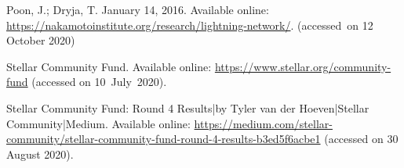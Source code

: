 \documentclass[applsci,article,accept,moreauthors,pdftex]{Definitions/mdpi}
\begin{document}
\begin{thebibliography}{999}
Poon, J.; Dryja, T.
  January 14, 2016.
Available online:   
\url{https://nakamotoinstitute.org/research/lightning-network/}.
\newblock (accessed~on 12 October 2020)  
  \pagebreak

Stellar Community Fund.  Available online:
\newblock \url{https://www.stellar.org/community-fund}  (accessed on 10~July~2020).

Stellar Community Fund: Round 4 Results|by Tyler van der Hoeven|Stellar
  Community|Medium.  Available online: 
  \url{https://medium.com/stellar-community/stellar-community-fund-round-4-results-b3ed5f6acbe1} (accessed on 30 August 2020).

\end{thebibliography}

 
 
\end{document}
